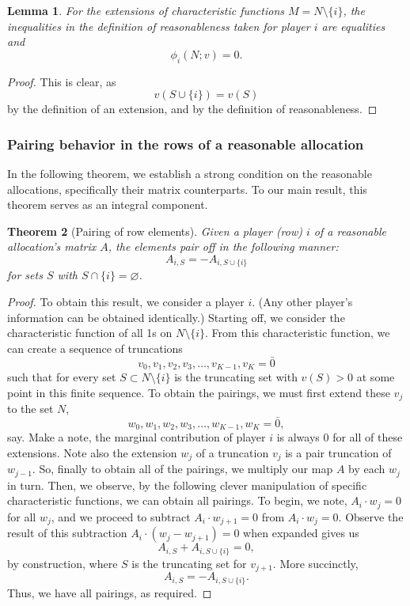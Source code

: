 \documentclass[12pt,letterpaper,final]{article}
\theoremstyle{plain}
\newtheorem{theorem}{Theorem}[section]
\theoremstyle{plain}
\theoremstyle{plain}
\newtheorem{lemma}[theorem]{Lemma}
\theoremstyle{plain}
\theoremstyle{plain}
\theoremstyle{plain}
\theoremstyle{plain}
\theoremstyle{definition}
\theoremstyle{definition}
\theoremstyle{definition}
\theoremstyle{definition}
\theoremstyle{definition}
\theoremstyle{remark}
\theoremstyle{remark}
\theoremstyle{remark}
\theoremstyle{remark}
\begin{document}
\begin{lemma}
  For the extensions of characteristic functions
  \(M=N\setminus\{i\}\), the inequalities in the definition of
  reasonableness taken for player \(i\)
  are equalities and
  \[
    \phi_i(N;v) = 0.
  \]
\end{lemma}

\begin{proof}
  This is clear, as \[v(S\cup \{i\}) = v(S)\]
  by the definition of an extension, and by the definition of reasonableness.
\end{proof}

\subsubsection{Pairing behavior in the rows of a reasonable allocation}

In the following theorem, we establish a strong condition on the
reasonable allocations, specifically their matrix counterparts. To our main
result, this theorem serves as an integral component.

\begin{theorem}[Pairing of row elements]\label{thm:rowWisePairing}
  Given a player (row) \(i\)  of a reasonable allocation's matrix
  \(A\), the elements pair off in the following manner:
  \begin{equation*}
    A_{i,S} = -A_{i,S\cup\{i\}}
  \end{equation*}
  for sets \(S\) with \(S \cap \{i\} = \varnothing\).
\end{theorem}

\begin{proof}
  To obtain this result, we consider a player \(i\). (Any other
  player's information can be obtained identically.) Starting off, we
  consider the characteristic function of all 1s on \(N\setminus
  \{i\}\). From this characteristic function, we
  can create a sequence of truncations 
  \[
    v_0, v_1, v_2, v_3, \ldots, v_{K-1},v_K = \bar{0}
  \]
  such that for every set \(S \subset N\setminus\{i\}\) is the truncating
  set with \(v(S) >0\) at some point in this finite sequence.
  To obtain the pairings, we must first extend these \(v_j\) to the
  set \(N\),
  \[
    w_0, w_1, w_2, w_3, \ldots, w_{K-1},w_K = \bar{0},
  \]
  say. Make a note, the marginal contribution of player \(i\) is
  always 0 for all of these extensions. Note also the extension \(w_j\) of
  a truncation \(v_j\) is a pair truncation of \(w_{j-1}\).
  So, finally to obtain all of
  the pairings, we multiply our map \(A\) by each \(w_j\) in turn.
  Then, we observe, by the following clever manipulation of
  specific characteristic functions, we can obtain all pairings.
  To begin, we note, \(A_i \cdot w_{j} = 0\) for all
  \(w_j\), and we proceed to subtract \(A_i \cdot w_{j+1} = 0\) from
  \(A_i \cdot w_{j} = 0\). Observe the result of this subtraction
  \(A_i \cdot (w_{j} - w_{j+1}) = 0\) when expanded gives us
  \[
    A_{i,S} + A_{i,S \cup \{i\}} = 0,
  \]
  by construction, where \(S\) is the truncating set for \(v_{j+1}\).  
  More succinctly,
  \[
    A_{i,S} = -A_{i,S\cup\{i\}}.
  \]
  Thus, we have all pairings, as required. 
\end{proof}
\end{document}
